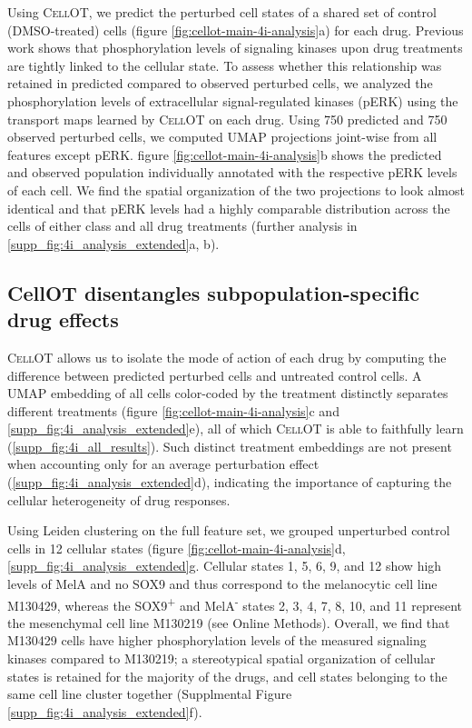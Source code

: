 Using \textsc{CellOT}, 
we predict the perturbed cell states of a shared set of control (DMSO-treated) cells (figure \ref{fig:cellot-main-4i-analysis}a) for each drug.
Previous work \cite{kramer2022} shows that phosphorylation levels of signaling kinases upon drug treatments are tightly linked to the cellular state. 
To assess whether this relationship was retained in predicted compared to observed perturbed cells, we analyzed the phosphorylation levels of extracellular signal-regulated kinases (pERK) using the transport maps learned by \textsc{CellOT} on each drug.
Using 750 predicted and 750 observed perturbed cells, we computed UMAP projections joint-wise from all features except pERK.
figure \ref{fig:cellot-main-4i-analysis}b shows the predicted and observed population individually annotated with the respective pERK levels of each cell.
We find the spatial organization of the two projections to look almost identical and that pERK levels had a highly comparable distribution across the cells of either class and all drug treatments (further analysis in \ref{supp_fig:4i_analysis_extended}a, b).

\subsection{CellOT disentangles subpopulation-specific drug effects}
\textsc{CellOT} allows us to 
isolate the mode of action of each drug by computing the difference between predicted perturbed cells and untreated control cells. %
A UMAP embedding of all cells color-coded by the treatment distinctly separates different treatments (figure \ref{fig:cellot-main-4i-analysis}c and \ref{supp_fig:4i_analysis_extended}e), all of which \textsc{CellOT} is able to faithfully learn (\ref{supp_fig:4i_all_results}).
Such distinct treatment embeddings are not present when accounting only for an average perturbation effect (\ref{supp_fig:4i_analysis_extended}d), indicating the importance of capturing the cellular heterogeneity of drug responses.

Using Leiden clustering on the full feature set, we grouped unperturbed control cells in 12 cellular states (figure \ref{fig:cellot-main-4i-analysis}d, \ref{supp_fig:4i_analysis_extended}g.
Cellular states 1, 5, 6, 9, and 12 show high levels of MelA and no SOX9 and thus correspond to the melanocytic cell line M130429, whereas the SOX9\textsuperscript{+} and MelA\textsuperscript{-} states 2, 3, 4, 7, 8, 10, and 11 represent the mesenchymal cell line M130219 (see Online Methods). Overall, we find that M130429 cells have higher phosphorylation levels of the measured signaling kinases compared to M130219;
a stereotypical spatial organization of cellular states is retained for the majority of the drugs,  and cell states belonging to the same cell line cluster together (Supplmental Figure \ref{supp_fig:4i_analysis_extended}f). 

